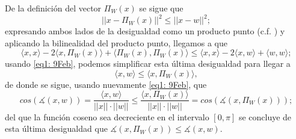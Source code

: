 De la definición del vector $\Pi_{W}(x)$ se sigue que
\[
|| x -\Pi_{W}(x) ||^{2} \leq  || x - w||^{2};
\]
expresando ambos lados de la desigualdad como un producto
punto (c.f. ) y aplicando la
bilinealidad del producto punto, llegamos a que
\[
\langle x , x \rangle -2 \langle x, \Pi_{W}(x) \rangle +
\langle \Pi_{W}(x) , \Pi_{W}(x) \rangle \leq 
\langle x , x \rangle  -2 \langle x , w \rangle 
+ \langle w , w \rangle ;
\]
usando \eqref{eq1: 9Feb}, podemos simplificar esta
última desigualdad para llegar a 
\[
\langle x, w \rangle \leq \langle x, \Pi_{W}(x) \rangle,
\]
de donde se sigue, usando nuevamente \eqref{eq1: 9Feb},
que 
\[
cos \left( \measuredangle (x,w) \right) =
\frac{\langle x , w \rangle}{||x||\cdot ||w||} \leq
\frac{\langle x ,  \Pi_{W}(x)  \rangle}{||x||\cdot ||w||} =
cos \left( \measuredangle \left(x, \Pi_{W}(x) \right) \right);
\]
del que la función coseno sea decreciente en el intervalo
$[0, \pi]$ se concluye de esta última desigualdad que
$ \measuredangle \left(x, \Pi_{W}(x) \right) \leq 
\measuredangle (x,w)$.
\QEDB
\vspace{0.2cm}



